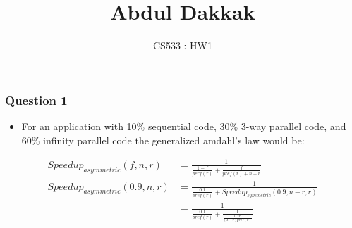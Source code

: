\documentclass[]{article}
\title{Abdul Dakkak}
\author{CS533 : HW1}
\date{}
\begin{document}
\maketitle

\subsubsection{Question 1}

\begin{itemize}
\itemsep1pt\parskip0pt
\item
  For an application with 10\% sequential code, 30\% 3-way parallel
  code, and 60\% infinity parallel code the generalized amdahl's law
  would be:
\end{itemize}

\begin{align*}

    Speedup_{asymmetric}(f, n, r) &= \frac{1}{\frac{1-f}{perf(r)} + \frac{f}{pref(r) + n - r}} \\
    Speedup_{asymmetric}(0.9, n, r) &= \frac{1}{\frac{0.1}{pref(r)} + Speedup_{symmetric}(0.9, n-r, r)} \\
                       &= \frac{1}{\frac{0.1}{pref(r)} + \frac{1}{\frac{0.1 r}{(3 - r) pref(r)}}}
\end{align*}
\end{document}
